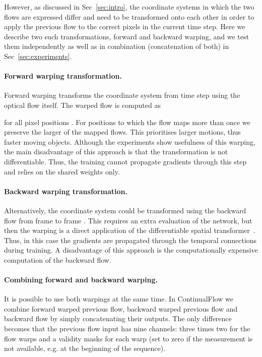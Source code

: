\documentclass[runningheads]{llncs}
\begin{document}
However, as discussed in Sec~\ref{sec:intro}, the coordinate systems in which the two flows are expressed differ and need to be transformed onto each other in order to apply the previous flow to the correct pixels in the current time step.
Here we describe two such transformations, forward and backward warping, and we test them independently as well as in combination (concatenation of both) in Sec~\ref{sec:experiments}.

\paragraph{\bf\textbf{Forward warping transformation.}} Forward warping transforms the coordinate system from time step  using the optical flow  itself. The warped flow  is computed as

for all pixel positions . For positions to which the flow  maps more than once we preserve the larger of the mapped flows.
This prioritises larger motions, thus faster moving objects. Although the experiments show usefulness of this warping, the main disadvantage of this approach is that the transformation is not differentiable.
Thus, the training cannot propagate gradients through this step and relies on the shared weights only.

\paragraph{\bf\textbf{Backward warping transformation.}} Alternatively, the coordinate system could be transformed using the backward flow  from frame  to frame .
This requires an extra evaluation of the network, but then the warping is a direct application of the differentiable spatial transformer~\cite{Jaderberg2015}.
Thus, in this case the gradients are propagated through the temporal connections during training.
A disadvantage of this approach is the computationally expensive computation of the backward flow.



\paragraph{\bf\textbf{Combining forward and backward warping.}} 
It is possible to use both warpings at the same time.
In ContinualFlow we combine forward warped previous flow, backward warped previous flow and backward flow by simply concatenating their outputs.
The only difference becomes that the previous flow input has nine channels: three times two for the flow warps and a validity masks for each warp (set to zero if the measurement is not available, e.g. at the beginning of the sequence).
\end{document}
